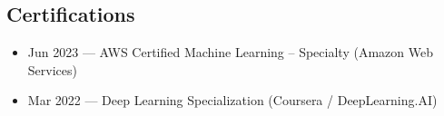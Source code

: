 \documentclass[10pt,letterpaper]{article}
\begin{document}
\begin{paracol}{2}
\begin{rightcolumn}
\section*{Certifications}
\begin{itemize}
  \item Jun 2023 — AWS Certified Machine Learning – Specialty (Amazon Web Services)
  \item Mar 2022 — Deep Learning Specialization (Coursera / DeepLearning.AI)
\end{itemize}

\end{rightcolumn}

\end{paracol}
\end{document}
